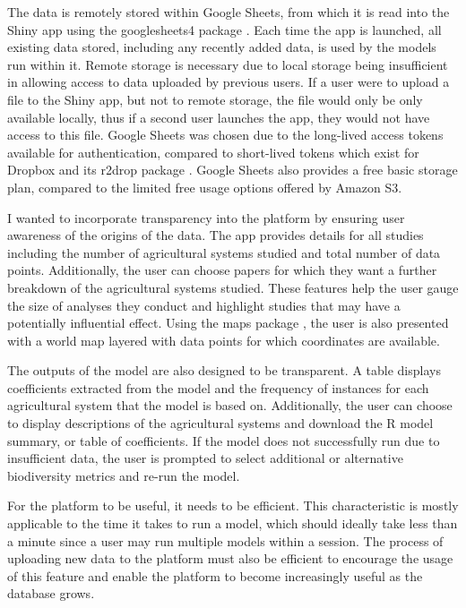 \documentclass[11pt]{article}
\begin{document}
		\noindent The data is remotely stored within Google Sheets, from which it is read into the Shiny app using the googlesheets4 package \citep{bryan2020googlesheets4}. Each time the app is launched, all existing data stored, including any recently added data, is used by the models run within it. Remote storage is necessary due to local storage being insufficient in allowing access to data uploaded by previous users. If a user were to upload a file to the Shiny app, but not to remote storage, the file would only be only available locally, thus if a second user launches the app, they would not have access to this file. Google Sheets was chosen due to the long-lived access tokens available for authentication, compared to short-lived tokens which exist for Dropbox and its r2drop package \citep{ram2020rdrop2}. Google Sheets also provides a free basic storage plan, compared to the limited free usage options offered by Amazon S3. 
		
		\noindent I wanted to incorporate transparency into the platform by ensuring user awareness of the  origins of the data. The app provides details for all studies including the number of agricultural systems studied and total number of data points. Additionally, the user can choose papers for which they want a further breakdown of the agricultural systems studied. These features help the user gauge the size of analyses they conduct and highlight studies that may have a potentially influential effect. Using the maps package \citep{becker2021maps}, the user is also presented with a world map layered with data points for which coordinates are available.
		
		\noindent The outputs of the model are also designed to be transparent. A table displays coefficients extracted from the model and the frequency of instances for each agricultural system that the model is based on. Additionally, the user can choose to display descriptions of the agricultural systems and download the R model summary, or table of coefficients. If the model does not successfully run due to insufficient data, the user is prompted to select additional or alternative biodiversity metrics and re-run the model.
		
		\noindent For the platform to be useful, it needs to be efficient. This characteristic is mostly applicable to the time it takes to run a model, which should ideally take less than a minute since a user may run multiple models within a session. The process of uploading new data to the platform must also be efficient to encourage the usage of this feature and enable the platform to become increasingly useful as the database grows.
		
\end{document}
